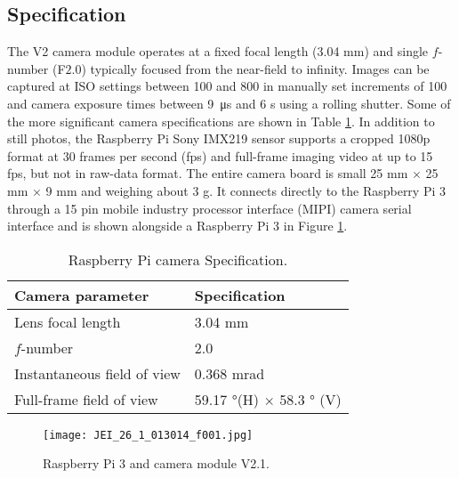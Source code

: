 \subsection{Specification}
\label{ssec:raspcamspecification}
The V2 camera module operates at a fixed focal length (3.04 \si{\milli\meter})
and single $f$-number (F$2.0$) typically focused from the near-field to
infinity. Images can be captured at ISO settings between 100 and 800 in manually
set increments of 100
and camera exposure times between \SI{9}{\micro\second} and 6 \si{\second} using
a rolling shutter. Some of the more significant camera specifications are shown
in Table \ref{tab:raspicamspec2}. In addition to still photos, the Raspberry Pi
Sony IMX219 sensor supports a cropped 1080p format at 30 frames per second (fps)
and full-frame imaging video at up to 15 fps, but not in raw-data format. The
entire camera board is small 25 \si{\milli\meter} $\times$ 25 \si{\milli\meter}
$\times$ 9 \si{\milli\meter} and weighing about $3$ \si{\gram}. \hfill \break \newline
It connects directly to the Raspberry Pi 3 through a 15 pin mobile industry processor
interface (MIPI) camera serial interface and is shown alongside a Raspberry Pi 3
in Figure \ref{fig:boardcam}.\cite{upton2016raspberry, raspberrycam}
%
\begin{table}[htb]
	\centering
	\caption{Raspberry Pi camera Specification.}
	\label{tab:raspicamspec2}
	\begin{tabular}{l l}
		\hline
		\textbf{Camera parameter}			& 	\textbf{Specification}\\
		\hline
		\rowcolor{aliceblue!85}Lens focal length 	& 	3.04 \si{\milli\meter}	\\
		$f$-number			&	2.0	\\
		\rowcolor{aliceblue!85}Instantaneous field of view	&	0.368 \si{\milli\radian}\\
		Full-frame field of view & 59.17 \si{\degree}(H) $\times$ 58.3 \si{\degree} (V)\\
		\hline
	\end{tabular}
\end{table}
%

\begin{figure}[htb]
	\centering
    \texttt{[image: JEI\_26\_1\_013014\_f001.jpg]}
    \caption{Raspberry Pi 3 and camera module V2.1.}
    \label{fig:boardcam}
\end{figure}